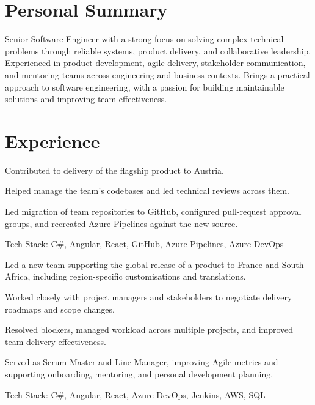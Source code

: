 \documentclass[]{deedy-resume-openfont}
\begin{document}
\begin{minipage}[t]{0.66\textwidth} 



\section{Personal Summary}

Senior Software Engineer with a strong focus on solving complex technical problems through reliable systems, product delivery, and collaborative leadership. Experienced in product development, agile delivery, stakeholder communication, and mentoring teams across engineering and business contexts. Brings a practical approach to software engineering, with a passion for building maintainable solutions and improving team effectiveness.

\section{Experience}
\vspace{\topsep}
\begin{tightemize}
\item Contributed to delivery of the flagship product to Austria.
\item Helped manage the team's codebases and led technical reviews across them.
\item Led migration of team repositories to GitHub, configured pull-request approval groups, and recreated Azure Pipelines against the new source.
\end{tightemize}
Tech Stack: C\#, Angular, React, GitHub, Azure Pipelines, Azure DevOps
\sectionsep

\vspace{\topsep}
\begin{tightemize}
\item Led a new team supporting the global release of a product to France and South Africa, including region-specific customisations and translations.
\item Worked closely with project managers and stakeholders to negotiate delivery roadmaps and scope changes.
\item Resolved blockers, managed workload across multiple projects, and improved team delivery effectiveness.
\item Served as Scrum Master and Line Manager, improving Agile metrics and supporting onboarding, mentoring, and personal development planning.
\end{tightemize}
Tech Stack: C\#, Angular, React, Azure DevOps, Jenkins, AWS, SQL
\sectionsep


\end{minipage}
\end{document}
